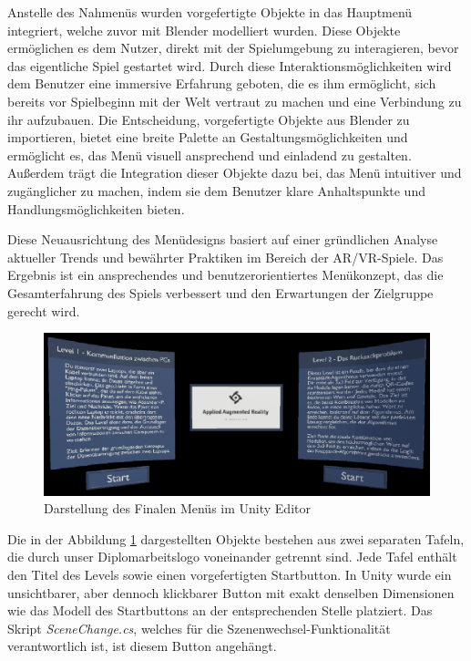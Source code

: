 Anstelle des Nahmenüs wurden vorgefertigte Objekte in das Hauptmenü integriert, welche zuvor mit Blender modelliert wurden.
Diese Objekte ermöglichen es dem Nutzer, direkt mit der Spielumgebung zu interagieren, bevor das eigentliche Spiel gestartet
wird. Durch diese Interaktionsmöglichkeiten wird dem Benutzer eine immersive Erfahrung geboten, die es ihm ermöglicht, sich
bereits vor Spielbeginn mit der Welt vertraut zu machen und eine Verbindung zu ihr aufzubauen.
Die Entscheidung, vorgefertigte Objekte aus Blender zu importieren, bietet eine breite Palette an Gestaltungsmöglichkeiten
und ermöglicht es, das Menü visuell ansprechend und einladend zu gestalten. Außerdem trägt die Integration dieser Objekte
dazu bei, das Menü intuitiver und zugänglicher zu machen, indem sie dem Benutzer klare Anhaltspunkte und Handlungsmöglichkeiten
bieten.

Diese Neuausrichtung des Menüdesigns basiert auf einer gründlichen Analyse aktueller Trends und bewährter Praktiken im
Bereich der AR/VR-Spiele. Das Ergebnis ist ein ansprechendes und benutzerorientiertes Menükonzept, das die Gesamterfahrung
des Spiels verbessert und den Erwartungen der Zielgruppe gerecht wird.

\begin{figure}[H]
    \centering
    \includegraphics[width=1\textwidth]{images/menuversion2.png}
    \caption{Darstellung des Finalen Menüs im Unity Editor}
    \label{fig:menuversion2}
\end{figure}

Die in der Abbildung \ref{fig:menuversion2} dargestellten Objekte bestehen aus zwei separaten Tafeln, die durch unser
Diplomarbeitslogo voneinander getrennt sind. Jede Tafel enthält den Titel des Levels sowie einen vorgefertigten Startbutton.
In Unity wurde ein unsichtbarer, aber dennoch klickbarer Button mit exakt denselben Dimensionen wie das Modell des Startbuttons
an der entsprechenden Stelle platziert. Das Skript \textit{SceneChange.cs}, welches für die Szenenwechsel-Funktionalität
verantwortlich ist, ist diesem Button angehängt.

